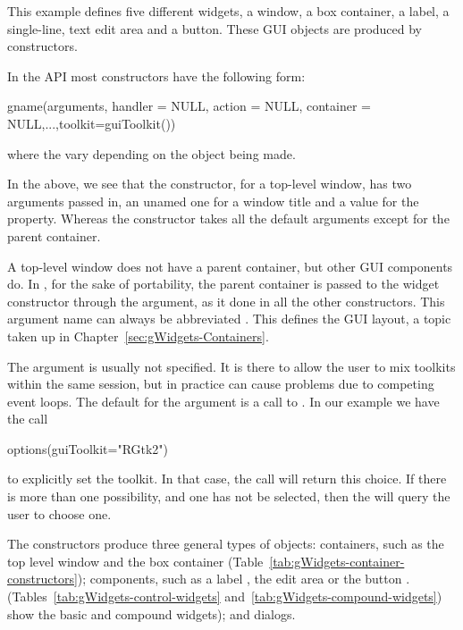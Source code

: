 This example defines five different widgets, a window, a box
container, a label, a single-line, text edit area and a button. These
GUI objects are produced by constructors.


In the  API most constructors have the following form: 
\begin{Schunk}
\begin{Sinput}
 gname(arguments, handler = NULL, action = NULL, 
       container = NULL,...,toolkit=guiToolkit())
\end{Sinput}
\end{Schunk}
where the  vary depending on the object being made. 

In the above, we see that the  constructor, for a
top-level window, has two arguments passed in, an unamed one for a
window title and a value for the  property. Whereas the
 constructor takes all the default arguments except for
the parent container.

A top-level window does not have a parent container, but other GUI
components do. In , for the sake of portability, the
parent container is passed to the widget constructor through the
 argument, as it done in all the other constructors.
This argument name can always be abbreviated . This defines
the GUI layout, a topic taken up in
Chapter~\ref{sec:gWidgets-Containers}.

The  argument is usually not specified. It is there to
allow the user to mix toolkits within the same \R\/ session, but in
practice can cause problems due to competing event loops. The default
for the  argument is a call to . 
In our example we have the call
\begin{Schunk}
\begin{Sinput}
 options(guiToolkit="RGtk2")
\end{Sinput}
\end{Schunk}
to explicitly set the toolkit. In that case, the call will return this
choice. If there is more than one possibility, and one has not be
selected, then the  will query the user to choose one.

The constructors produce three general types of objects: containers,
such as the top level window  and the box container 
(Table~\ref{tab:gWidgets-container-constructors}); components, such as
a label , the edit area  or the button .
(Tables~\ref{tab:gWidgets-control-widgets} and~\ref{tab:gWidgets-compound-widgets}) show the basic and compound
widgets); and dialogs.



